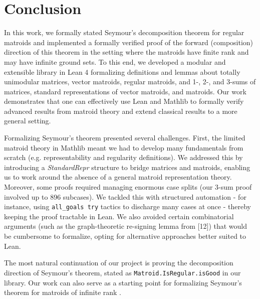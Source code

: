 \section{Conclusion}

In this work, we formally stated Seymour's decomposition theorem for regular matroids and implemented a formally verified proof of the forward (composition) direction of this theorem in the setting where the matroids have finite rank and may have infinite ground sets. To this end, we developed a modular and extensible library in Lean 4 formalizing definitions and lemmas about totally unimodular matrices, vector matroids, regular matroids, and 1-, 2-, and 3-sums of matrices, standard representations of vector matroids, and matroids.
Our work demonstrates that one can effectively use Lean and Mathlib to formally verify advanced results from matroid theory and extend classical results to a more general setting.

Formalizing Seymour's theorem presented several challenges. 
First, the limited matroid theory in Mathlib meant we had to develop many fundamentals from scratch (e.g. representability and regularity definitions). 
We addressed this by introducing a \emph{StandardRepr} structure to bridge matrices and matroids, enabling us to work around the absence of a general matroid representation theory. 
Moreover, some proofs required managing enormous case splits (our 3-sum proof involved up to 896 subcases). We tackled this with structured automation - for instance, using \verb|all_goals try| tactics to discharge many cases at once - thereby keeping the proof tractable in Lean. 
We also avoided certain combinatorial arguments (such as the graph-theoretic re-signing lemma from [12]) that would be cumbersome to formalize, opting for alternative approaches better suited to Lean. 


The most natural continuation of our project is proving the decomposition direction of Seymour's theorem, stated as \texttt{Matroid.IsRegular.isGood} in our library. Our work can also serve as a starting point for formalizing Seymour's theorem for matroids of infinite rank \cite{Bowler2013}.

